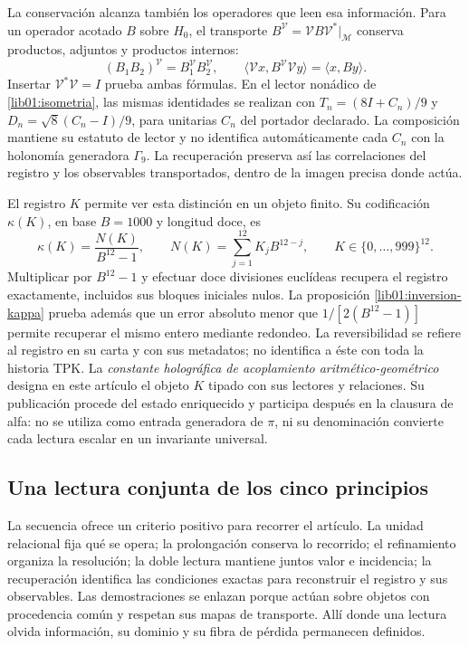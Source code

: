 La conservación alcanza también los operadores que leen esa información.
Para un operador acotado \(B\) sobre \(H_0\), el transporte
\(B^{\mathcal V}=\mathcal VB\mathcal V^*|_{\mathcal M}\) conserva
productos, adjuntos y productos internos:
\[
 (B_1B_2)^{\mathcal V}=B_1^{\mathcal V}B_2^{\mathcal V},\qquad
 \langle\mathcal Vx,B^{\mathcal V}\mathcal Vy\rangle
                       =\langle x,By\rangle.
\]
Insertar \(\mathcal V^*\mathcal V=I\) prueba ambas fórmulas. En el
lector nonádico de \cref{lib01:isometria}, las mismas identidades se
realizan con \(T_n=(8I+C_n)/9\) y
\(D_n=\sqrt8(C_n-I)/9\), para unitarias \(C_n\) del portador
declarado. La composición mantiene su estatuto de lector y no identifica
automáticamente cada \(C_n\) con la holonomía generadora \(\Gamma_9\).
La recuperación preserva así las correlaciones del registro y los
observables transportados, dentro de la imagen precisa donde actúa.

El registro \(K\) permite ver esta distinción en un objeto finito. Su
codificación \(\kappa(K)\), en base \(B=1000\) y longitud doce, es
\[
 \kappa(K)=\frac{N(K)}{B^{12}-1},\qquad
 N(K)=\sum_{j=1}^{12}K_jB^{12-j},\qquad
 K\in\{0,\ldots,999\}^{12}.
\]
Multiplicar por \(B^{12}-1\) y efectuar doce divisiones euclídeas
recupera el registro exactamente, incluidos sus bloques iniciales nulos.
La proposición \cref{lib01:inversion-kappa} prueba además que un error
absoluto menor que \(1/[2(B^{12}-1)]\) permite recuperar el mismo entero
mediante redondeo. La reversibilidad se refiere al registro en su carta y
con sus metadatos; no identifica a éste con toda la historia TPK. La
\emph{constante holográfica de acoplamiento aritmético-geométrico} designa
en este artículo el objeto \(K\) tipado con sus lectores y relaciones. Su
publicación procede del estado enriquecido y participa después en la
clausura de alfa: no se utiliza como entrada generadora de \(\pi\), ni
su denominación convierte cada lectura escalar en un invariante universal.

\subsection*{Una lectura conjunta de los cinco principios}

La secuencia ofrece un criterio positivo para recorrer el artículo. La unidad
relacional fija qué se opera; la prolongación conserva lo recorrido; el
refinamiento organiza la resolución; la doble lectura mantiene juntos valor
e incidencia; la recuperación identifica las condiciones exactas para
reconstruir el registro y sus observables. Las demostraciones se enlazan
porque actúan sobre objetos con procedencia común y respetan sus mapas de
transporte. Allí donde una lectura olvida información, su dominio y su
fibra de pérdida permanecen definidos.

